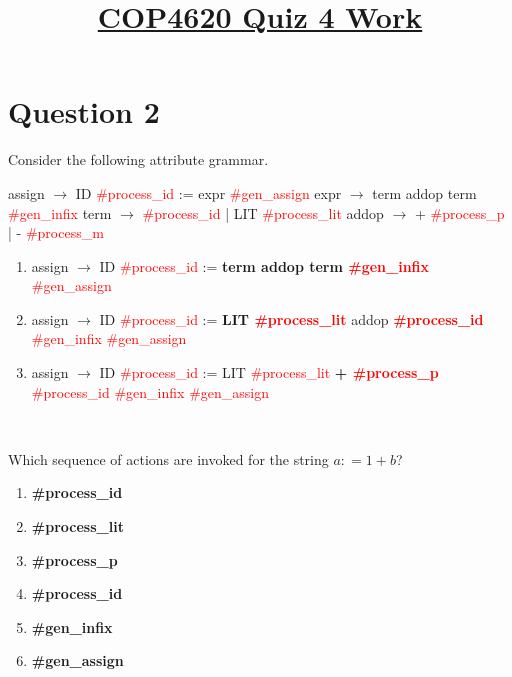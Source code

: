 \documentclass{article}
\title{\vspace{-50pt}\textbf{\underline{COP4620 Quiz 4 Work}}}
\author{}
\date{}
\newcommand{\textr}[1]{\textcolor{red}{#1}}
\begin{document}
\maketitle
\vspace{-60pt}


\section*{Question 2}
Consider the following attribute grammar.\newline

assign \hspace{.25em} $\rightarrow$ ID \textr{\#process\_id} := expr \textr{\#gen\_assign} \newline
expr \hspace{1em} $\rightarrow$ term addop term \textr{\#gen\_infix} \newline
term \hspace{.75em} $\rightarrow$ \textr{\#process\_id} | LIT \textr{\#process\_lit} \newline
addop \hspace{.2em} $\rightarrow$ + \textr{\#process\_p} | - \textr{\#process\_m} \newline

\begin{enumerate}[wide, labelwidth=!, labelindent=0pt]
  \item assign $\rightarrow$ ID \textr{\#process\_id} := \textbf{term addop term \textr{\#gen\_infix}} \textr{\#gen\_assign}
  \item assign $\rightarrow$ ID \textr{\#process\_id} := \textbf{LIT \textr{\#process\_lit}} addop \textbf{\textr{\#process\_id}} \textr{\#gen\_infix} \textr{\#gen\_assign}
  \item assign $\rightarrow$ ID \textr{\#process\_id} := LIT \textr{\#process\_lit} \textbf{+ \textr{\#process\_p}} \textr{\#process\_id} \textr{\#gen\_infix} \textr{\#gen\_assign}
\end{enumerate} \

Which sequence of actions are invoked for the string $a : = 1 + b$? 

\begin{enumerate}
  \item \textbf{\#process\_id}
  \item \textbf{\#process\_lit}
  \item \textbf{\#process\_p}
  \item \textbf{\#process\_id}
  \item \textbf{\#gen\_infix}
  \item \textbf{\#gen\_assign}
\end{enumerate}
\end{document}
